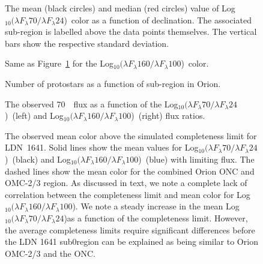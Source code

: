 \documentclass[manuscript]{aastex61}
\newcommand{\clra}{Log$_{10}(\lambda F_\lambda70/\lambda F_\lambda24$)}
\newcommand{\clrb}{Log$_{10}(\lambda F_\lambda160/\lambda F_\lambda100$)}
\begin{document}
\clearpage

%
%
%

\begin{figure}[ht]
\centering
{}
\caption{The mean (black circles) and median (red circles) value of \clra\ color as a function of declination.  The associated sub-region is labelled above the data points themselves.  The vertical bars show the respective standard deviation.  \label{fig:clr1_v_dec}}
\end{figure}

\clearpage

\begin{figure}[ht]
\centering
{}
\caption{Same as Figure~\ref{fig:clr1_v_dec} for the \clrb\ color.  \label{fig:clr2_v_dec}}
\end{figure}

\clearpage

\begin{figure}[ht]
\centering
{}
\caption{Number of protostars as a function of sub-region in Orion.\label{fig:num_v_dec}}
\end{figure}

\clearpage

\begin{figure}[ht]
\centering
{}
\caption{The observed 70~\micron\ flux as a function of the \clra\ (left) and \clrb\ (right) flux ratios.\label{fig:clrflux}}
\end{figure}

\clearpage

\begin{figure}[ht]
\centering
{}
\caption{The observed mean color above the simulated completeness limit for LDN~1641.  Solid lines show the mean values for \clra\ (black) and \clrb\ (blue) with limiting flux.  The dashed lines show the mean color for the combined Orion ONC and OMC-2/3 region.  As discussed in text, we note a complete lack of correlation between the completeness limit and mean color for \clrb.  We note a steady increase in the mean \clra as a function of the completeness limit.  However, the average completeness limits require significant differences before the LDN 1641 sub0region can be explained as being similar to Orion OMC-2/3 and the ONC.\label{fig:clr_v_limit}}
\end{figure}
\end{document}
